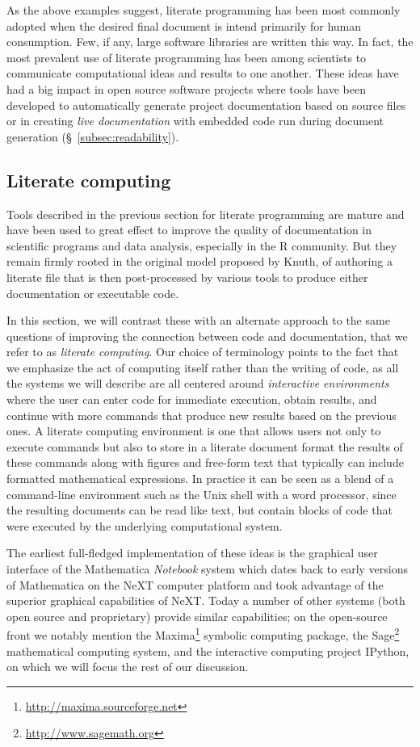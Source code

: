 \documentclass[ChapterTOCs,krantz2]{krantz} %
\begin{document}
As the above examples suggest, literate programming has been most commonly
adopted when the desired final document is intend primarily for human
consumption.  Few, if any, large software libraries are written this way.
In fact, the most prevalent use of literate programming has been among
scientists to communicate computational ideas and results to one another.
These ideas have had a big impact in open source
software projects where tools have been developed to automatically generate
project documentation based on source files or in creating
\emph{live documentation} with embedded code run during document generation (§~\ref{subsec:readability}).

\subsection{Literate computing}

Tools described in the previous section for literate programming are mature and
have been used to great effect to improve the quality of documentation in
scientific programs and data analysis, especially in the R community.  But they
remain firmly rooted in the original model proposed by Knuth, of authoring a
literate file that is then post-processed by various tools to produce either
documentation or executable code.  

In this section, we will contrast these with an alternate approach to the same
questions of improving the connection between code and documentation, that we
refer to as \emph{literate computing}.  Our choice of terminology points to the
fact that we emphasize the act of computing itself rather than the writing of
code, as all the systems we will describe are all centered around
\emph{interactive environments} where the user can enter code for immediate
execution, obtain results, and continue with more commands that produce new
results based on the previous ones.  A literate computing environment is one
that allows users not only to execute commands but also to store in a literate
document format the results of these commands along with figures and free-form
text that typically can include formatted mathematical expressions.  In
practice it can be seen as a blend of a command-line environment such as the
Unix shell with a word processor, since the resulting documents can be read
like text, but contain blocks of code that were executed by the underlying
computational system.

The earliest full-fledged implementation of these ideas is the graphical user
interface of the Mathematica \emph{Notebook} system which dates back to early
versions of Mathematica on the NeXT computer platform and took advantage of the
superior graphical capabilities of NeXT.  Today a number of other systems (both
open source and proprietary) provide similar capabilities; on the open-source
front we notably mention the Maxima\footnote{\url{http://maxima.sourceforge.net}} symbolic computing
package, the Sage\footnote{\url{http://www.sagemath.org}} mathematical computing system, and the
interactive computing project IPython, on which we will focus the rest of our
discussion.
\end{document}
